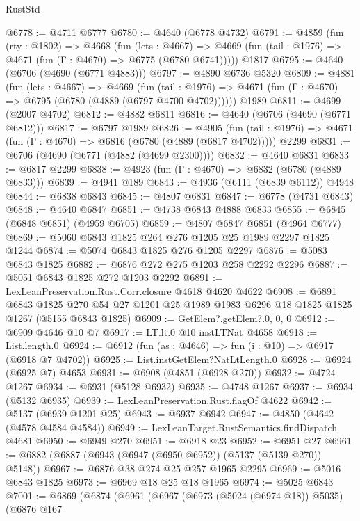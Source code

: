 \begin{lexlean}{RustStd}
\begin{coremodule}
@6778 := @4711 @6777
@6780 := @4640 (@6778 @4732)
@6791 := @4859
    (fun (rty : @1802) =>
    @4668
      (fun (lets : @4667) =>
      @4669 (fun (tail : @1976) => @4671 (fun (Γ : @4670) => @6775 (@6780 @6741)))))
    @1817
@6795 := @4640 (@6706 (@4690 (@6771 @4883)))
@6797 := @4890 @6736 @5320
@6809 := @4881
    (fun (lets : @4667) =>
    @4669
      (fun (tail : @1976) => @4671 (fun (Γ : @4670) => @6795 (@6780 (@4889 (@6797 @4700 @4702))))))
    @1989
@6811 := @4699 (@2007 @4702)
@6812 := @4882 @6811
@6816 := @4640 (@6706 (@4690 (@6771 @6812)))
@6817 := @6797 @1989
@6826 := @4905
    (fun (tail : @1976) => @4671 (fun (Γ : @4670) => @6816 (@6780 (@4889 (@6817 @4702)))))
    @2299
@6831 := @6706 (@4690 (@6771 (@4882 (@4699 @2300))))
@6832 := @4640 @6831
@6833 := @6817 @2299
@6838 := @4923 (fun (Γ : @4670) => @6832 (@6780 (@4889 @6833)))
@6839 := @4941 @189
@6843 := @4936 (@6111 (@6839 @6112)) @4948
@6844 := @6838 @6843
@6845 := @4807 @6831
@6847 := @6778 (@4731 @6843)
@6848 := @4640 @6847
@6851 := @4738 @6843 @4888 @6833
@6855 := @6845 (@6848 @6851) (@4959 @6705)
@6859 := @4807 @6847 @6851 (@4964 @6777)
@6869 := @5060 @6843 @1825 @264 @276 @1205 @25 @1989 @2297 @1825 @1244
@6874 := @5074 @6843 @1825 @276 @1205 @2297
@6876 := @5083 @6843 @1825
@6882 := @6876 @272 @275 @1203 @258 @2292 @2296
@6887 := @5051 @6843 @1825 @272 @1203 @2292
@6891 := LexLeanPreservation.Rust.Corr.closure @4618 @4620 @4622
@6908 := @6891
    @6843
    @1825
    @270
    @54
    @27
    @1201
    @25
    @1989
    @1983
    @6296
    @18
    @1825
    @1825
    @1267
    (@5155 @6843 @1825)
@6909 := GetElem?.getElem?.{0, 0, 0}
@6912 := @6909 @4646 @10 @7
@6917 := LT.lt.{0} @10 instLTNat @4658
@6918 := List.length.{0}
@6924 := @6912 (fun (as : @4646) => fun (i : @10) => @6917 (@6918 @7 @4702))
@6925 := List.instGetElem?NatLtLength.{0}
@6928 := @6924 (@6925 @7) @4653
@6931 := @6908 (@4851 (@6928 @270))
@6932 := @4724 @1267
@6934 := @6931 (@5128 @6932)
@6935 := @4748 @1267
@6937 := @6934 (@5132 @6935)
@6939 := LexLeanPreservation.Rust.flagOf @4622
@6942 := @5137 (@6939 @1201 @25)
@6943 := @6937 @6942
@6947 := @4850 (@4642 (@4578 @4584 @4584))
@6949 := LexLeanTarget.RustSemantics.findDispatch @4681
@6950 := @6949 @270
@6951 := @6918 @23
@6952 := @6951 @27
@6961 := @6882 (@6887 (@6943 (@6947 (@6950 @6952)) (@5137 (@5139 @270)) @5148))
@6967 := @6876 @38 @274 @25 @257 @1965 @2295
@6969 := @5016 @6843 @1825
@6973 := @6969 @18 @25 @18 @1965
@6974 := @5025 @6843
@7001 := @6869
    (@6874
      (@6961
        (@6967
          (@6973 (@5024 (@6974 @18)) @5035)
          (@6876
            @167

\end{coremodule}
\end{lexlean}
